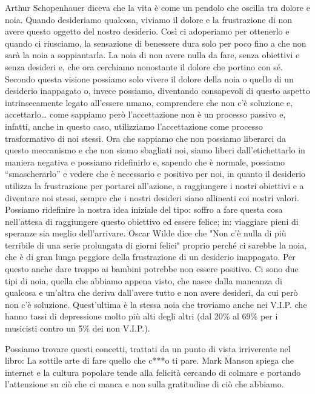 \documentclass[12pt]{book} %
\begin{document}
Arthur Schopenhauer diceva che la vita è come un pendolo che oscilla tra dolore e noia.
Quando desideriamo qualcosa, viviamo il dolore e la frustrazione di non avere questo oggetto del nostro desiderio. Così
ci adoperiamo per ottenerlo e quando ci riusciamo, la sensazione di benessere dura solo per poco fino a che non sarà la noia a soppiantarla. La noia di non
avere nulla da fare, senza obiettivi e senza desideri e, che ora cerchiamo nonostante il dolore che portino con sé.
Secondo questa visione possiamo solo vivere il dolore della noia o quello di un desiderio inappagato o, invece
possiamo, diventando consapevoli di questo aspetto intrinsecamente legato all'essere umano, 
comprendere che non c'è soluzione e, accettarlo… come sappiamo però
l'accettazione non è un processo passivo e, infatti, anche in questo caso, utilizziamo
l'accettazione come processo trasformativo di noi stessi. Ora che sappiamo che non possiamo
liberarci da questo meccanismo e che non siamo sbagliati noi, siamo liberi dall'etichettarlo in
maniera negativa e possiamo ridefinirlo e, sapendo che è normale, possiamo “smascherarlo” e vedere che è necessario e
positivo per noi, in quanto il desiderio utilizza la frustrazione per portarci all'azione, a
raggiungere i nostri obiettivi e a diventare noi stessi, sempre che i nostri desideri siano allineati coi nostri
valori. Possiamo ridefinire la nostra idea iniziale del tipo: soffro a fare questa cosa
nell'attesa di raggiungere questo obiettivo ed essere felice; in: viaggiare pieni di speranze sia
meglio dell'arrivare. Oscar Wilde dice che "Non c'è nulla di più terribile di
una serie prolungata di giorni felici" proprio perché ci sarebbe la noia, che è di gran lunga
peggiore della frustrazione di un desiderio inappagato. Per questo anche dare troppo ai bambini potrebbe non essere
positivo. Ci sono due tipi di noia, quella che abbiamo appena visto, che nasce dalla mancanza di qualcosa e
un'altra che deriva dall'avere tutto e non avere desideri, da cui però non
c'è soluzione. Quest'ultima è la stessa noia che troviamo anche nei V.I.P.
che hanno tassi di depressione molto più alti degli altri (dal 20\% al 69\% per i musicisti contro un 5\% dei non V.I.P.).

Possiamo trovare questi concetti, trattati da un punto di vista irriverente nel libro: La sottile arte di fare quello
che c***o ti pare. Mark Manson spiega che internet e la cultura popolare
tende alla felicità cercando di colmare e portando l'attenzione su ciò che ci manca e non sulla gratitudine di ciò che abbiamo.
\end{document}
